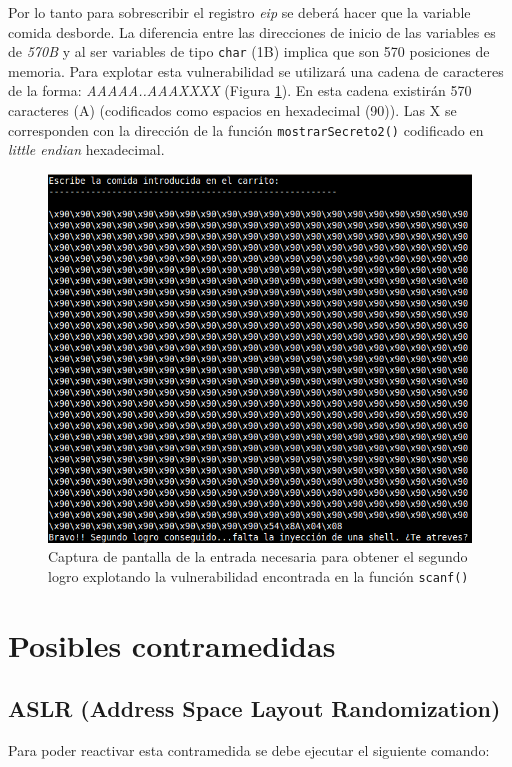 \documentclass[10pt,a4paper]{article}
\begin{document}
Por lo tanto para sobrescribir el registro \emph{eip} se deberá hacer que la variable comida desborde. La diferencia entre las direcciones de inicio de las variables es de \emph{570B} y al ser variables de tipo \texttt{char} (1B) implica que son 570 posiciones de memoria. Para explotar esta vulnerabilidad se utilizará una cadena de caracteres de la forma: \emph{AAAAA..AAAXXXX} (Figura \ref{fig:inputSegundoLogroScanf}). En esta cadena existirán 570 caracteres (A) (codificados como espacios en hexadecimal (90)). Las X se corresponden con la dirección de la función \texttt{mostrarSecreto2()} codificado en \emph{little endian} hexadecimal.\\

\begin{figure}[h!]
\centering
\includegraphics[scale=0.9]{images/segundo_logro_scanf.png}
\caption{Captura de pantalla de la entrada necesaria para obtener el segundo logro explotando la vulnerabilidad encontrada en la función \texttt{scanf()}}
\label{fig:inputSegundoLogroScanf}
\end{figure}


\section{Posibles contramedidas}

\subsection{ASLR (Address Space Layout Randomization)} 
Para poder reactivar esta contramedida se debe ejecutar el siguiente comando:\\
\end{document}
